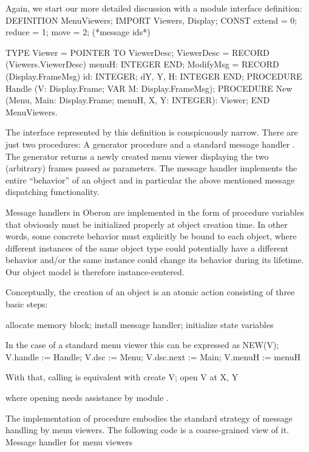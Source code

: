 Again, we start our more detailed discussion with a module interface definition:
\begintt
DEFINITION MenuViewers;
  IMPORT Viewers, Display;
  CONST extend = 0; reduce = 1; move = 2; (*message ids*)

  TYPE
    Viewer = POINTER TO ViewerDesc;
    ViewerDesc = RECORD (Viewers.ViewerDesc)
      menuH: INTEGER
    END;
    ModifyMsg = RECORD (Display.FrameMsg)
      id: INTEGER;
      dY, Y, H: INTEGER
   END;
   PROCEDURE Handle (V: Display.Frame; VAR M: Display.FrameMsg);
   PROCEDURE New (Menu, Main: Display.Frame;
                  menuH, X, Y: INTEGER): Viewer;
END MenuViewers.
\endtt

The interface represented by this definition is conspicuously
narrow. There are just two procedures: A generator procedure  and a
standard message handler . The generator returns a newly created
menu viewer displaying the two (arbitrary) frames passed as
parameters. The message handler implements the entire ``behavior'' of an
object and in particular the above mentioned message dispatching
functionality.

Message handlers in Oberon are implemented in the form of procedure
variables that obviously must be initialized properly at object
creation time. In other words, some concrete behavior must explicitly
be bound to each object, where different instances of the same object
type could potentially have a different behavior and/or the same
instance could change its behavior during its lifetime. Our object
model is therefore instance-centered.

Conceptually, the creation of an object is an atomic action consisting
of three basic steps:

allocate memory block; install message handler; initialize state variables

\noindent In the case of a standard menu viewer  this can be expressed as
\begintt
NEW(V);
V.handle := Handle;
V.dsc := Menu;
V.dsc.next := Main;
V.menuH := menuH
\endtt

\noindent With that, calling  is equivalent with
\begintt
create V; open V at X, Y
\endtt

\noindent where opening  needs assistance by module .

The implementation of procedure  embodies the standard strategy of message handling by
menu viewers. The following code is a coarse-grained view of it.
\begintt
Message handler for menu viewers

